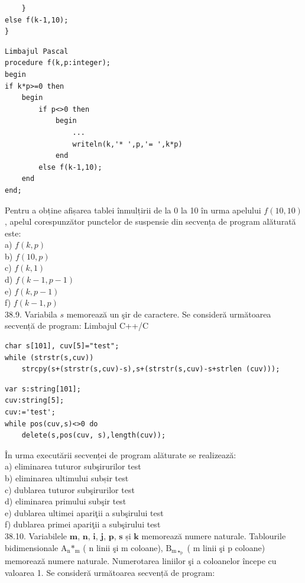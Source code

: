 \begin{itemize}
\begin{enumerate}
\begin{verbatim}
    }
else f(k-1,10);
}
\end{verbatim}
\begin{verbatim}
Limbajul Pascal
procedure f(k,p:integer);
begin
if k*p>=0 then
    begin
        if p<>0 then
            begin
                ...
                writeln(k,'* ',p,'= ',k*p)
            end
        else f(k-1,10);
    end
end;
\end{verbatim}
Pentru a obține afișarea tablei înmulțirii de la 0 la 10 în urma apelului $f(10,10)$, apelul corespunzător punctelor de suspensie din secvența de program alăturată este:
\\
a) $f(k, p)$
\\
b) $f(10, p)$
\\
c) $f(k, 1)$
\\
d) $f(k-1, p-1)$
\\
e) $f(k, p-1)$
\\
f) $f(k-1, p)$
\\
38.9. Variabila $s$ memorează un şir de caractere. Se consideră următoarea secvență de program:
Limbajul C++/C
\begin{verbatim}
char s[101], cuv[5]="test";
while (strstr(s,cuv))
    strcpy(s+(strstr(s,cuv)-s),s+(strstr(s,cuv)-s+strlen (cuv)));
\end{verbatim}
\begin{verbatim}
var s:string[101];
cuv:string[5];
cuv:='test';
while pos(cuv,s)<>0 do
    delete(s,pos(cuv, s),length(cuv));
\end{verbatim}
În urma executării secvenței de program alăturate se realizează:
\\
a) eliminarea tuturor subşirurilor test
\\
b) eliminarea ultimului subșir test
\\
c) dublarea tuturor subşirurilor test
\\
d) eliminarea primului subşir test
\\
e) dublarea ultimei apariţii a subşirului test
\\
f) dublarea primei apariţii a subşirului test
\\
38.10. Variabilele $\mathbf{m}$, $\mathbf{n}$, $\mathbf{i}$, $\mathbf{j}$, $\mathbf{p}$, $\mathbf{s}$ și $\mathbf{k}$ memorează numere naturale. Tablourile bidimensionale $\mathrm{A}_{\mathrm{n}} \mathrm{*}_{\mathrm{m}}$ ( n linii şi m coloane), $\mathrm{B}_{\mathrm{m} \star_{\mathrm{p}}}$ ( m linii şi p coloane) memorează numere naturale. Numerotarea liniilor şi a coloanelor începe cu valoarea 1.
Se consideră următoarea secvență de program:
\begin{verbatim}

\end{verbatim}
\end{enumerate}
\end{itemize}
